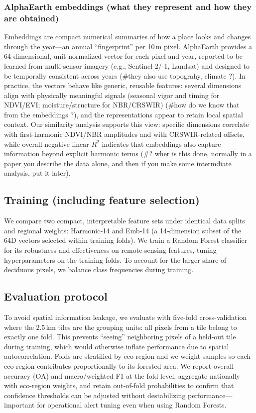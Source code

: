 \documentclass[utf8]{FrontiersinHarvard}
\begin{document}
\subsubsection{AlphaEarth embeddings (what they represent and how they are obtained)}
Embeddings are compact numerical summaries of how a place looks and changes through the year—an annual “fingerprint” per 10\,m pixel. AlphaEarth provides a 64‑dimensional, unit‑normalized vector for each pixel and year, reported to be learned from multi‑sensor imagery (e.g., Sentinel‑2/‑1, Landsat) and designed to be temporally consistent across years \citep{AlphaEarth2025} (#they also use topograhy, climate ?). In practice, the vectors behave like generic, reusable features: several dimensions align with physically meaningful signals (seasonal vigor and timing for NDVI/EVI; moisture/structure for NBR/CRSWIR) (#how do we know that from the embeddings ?), and the representations appear to retain local spatial context. Our similarity analysis supports this view: specific dimensions correlate with first‑harmonic NDVI/NBR amplitudes and with CRSWIR‑related offsets, while overall negative linear $R^2$ indicates that embeddings also capture information beyond explicit harmonic terms (#? wher is this done, normally in a paper you describe the data alone, 
and then if you make some intermdiate analysis, put it later).

\subsection{Training (including feature selection)}
We compare two compact, interpretable feature sets under identical data splits and regional weights: Harmonic‑14 and Emb‑14 (a 14‑dimension subset of the 64D vectors selected within training folds). We train a Random Forest classifier for its robustness and effectiveness on remote-sensing features, tuning hyperparameters on the training folds. To account for the larger share of deciduous pixels, we balance class frequencies during training.

\subsection{Evaluation protocol}
To avoid spatial information leakage, we evaluate with five-fold cross-validation where the 2.5\,km tiles are the grouping units: all pixels from a tile belong to exactly one fold. This prevents “seeing” neighboring pixels of a held‑out tile during training, which would otherwise inflate performance due to spatial autocorrelation. Folds are stratified by eco-region and we weight samples so each eco-region contributes proportionally to its forested area. We report overall accuracy (OA) and macro/weighted F1 at the fold level, aggregate nationally with eco-region weights, and retain out-of-fold probabilities to confirm that confidence thresholds can be adjusted without destabilizing performance—important for operational alert tuning even when using Random Forests.
\end{document}
